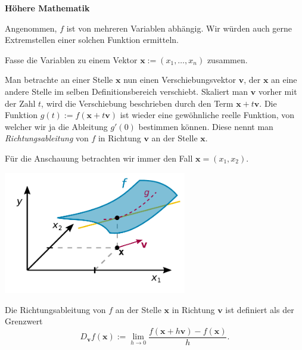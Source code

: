 \documentclass{beamer}
\newcommand{\strong}[1]{\textsf{\textbf{#1}}}
\begin{document}
\begin{frame}
\begin{center}
\strong{Höhere Mathematik}
\end{center}
\end{frame}

\begin{frame}
Angenommen, $f$ ist von mehreren Variablen abhängig. Wir würden
auch gerne Extremstellen einer solchen Funktion ermitteln.
\end{frame}

\begin{frame}
Fasse die Variablen zu einem Vektor
$\mathbf x:=(x_1,\ldots,x_n)$
zusammen.\pause

\vspace{0.8em}
Man betrachte an einer Stelle $\mathbf x$ nun einen Verschiebungsvektor
$\mathbf v$, der $\mathbf x$ an eine andere Stelle im selben
Definitionsbereich verschiebt. Skaliert man $\mathbf v$ vorher
mit der Zahl $t$, wird die Verschiebung beschrieben durch den Term
$\mathbf x+t\mathbf v$. Die Funktion
$g(t):=f(\mathbf x+t\mathbf v)$ ist wieder
eine gewöhnliche reelle Funktion, von welcher wir ja die Ableitung
$g'(0)$ bestimmen können. Diese nennt man \emph{Richtungsableitung}
von $f$ in Richtung $\mathbf v$ an der Stelle $\mathbf x$.
\end{frame}

\begin{frame}[t]
\vspace{2em}
Für die Anschauung betrachten wir immer den Fall
$\mathbf x = (x_1,x_2)$.
\pause

\vspace{-1em}
\begin{center}
\includegraphics[width=80mm]{img/Richtungsableitung.pdf}
\end{center}
\end{frame}

\begin{frame}
\begin{Definition}
Die Richtungsableitung von $f$ an der Stelle $\mathbf x$ in
Richtung $\mathbf v$ ist definiert als der Grenzwert
\[D_{\mathbf v} f(\mathbf x) := \lim_{h\to 0}\frac{f(\mathbf x+h\mathbf v)-f(\mathbf x)}{h}.\]
\end{Definition}
\end{frame}
\end{document}
